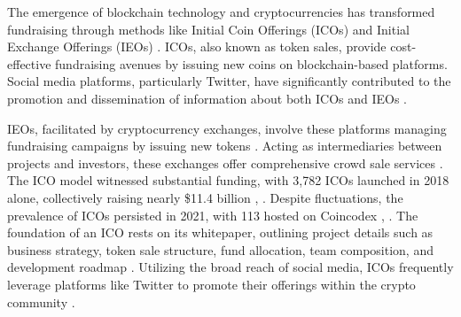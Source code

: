 \documentclass[runningheads]{llncs}
\begin{document}
The emergence of blockchain technology and cryptocurrencies has transformed fundraising through methods like Initial Coin Offerings (ICOs) and Initial Exchange Offerings (IEOs) \cite{campino2021initial}. ICOs, also known as token sales, provide cost-effective fundraising avenues by issuing new coins on blockchain-based platforms. Social media platforms, particularly Twitter, have significantly contributed to the promotion and dissemination of information about both ICOs and IEOs \cite{tiwari2020future}.

IEOs, facilitated by cryptocurrency exchanges, involve these platforms managing fundraising campaigns by issuing new tokens \cite{chamorro2021financing}. Acting as intermediaries between projects and investors, these exchanges offer comprehensive crowd sale services \cite{vivion2020supporting}. The ICO model witnessed substantial funding, with 3,782 ICOs launched in 2018 alone, collectively raising nearly \$11.4 billion \cite{boreiko2019new}, \cite{giudici2019impact}. Despite fluctuations, the prevalence of ICOs persisted in 2021, with 113 hosted on Coincodex \cite{giudici2019impact}, \cite{daskalakis2020introduction}. The foundation of an ICO rests on its whitepaper, outlining project details such as business strategy, token sale structure, fund allocation, team composition, and development roadmap \cite{daskalakis2020introduction}. Utilizing the broad reach of social media, ICOs frequently leverage platforms like Twitter to promote their offerings within the crypto community \cite{drobetz2019investor}.




\end{document}
